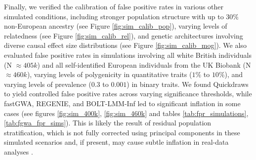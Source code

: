 %
Finally, we verified the calibration of false positive rates in various other simulated conditions, including stronger population structure with up to $30\%$ non-European ancestry (see Figure \ref{fig:sim_calib_pop}), varying levels of relatedness (see Figure \ref{fig:sim_calib_rel}), and genetic architectures involving diverse causal effect size distributions (see Figure \ref{fig:sim_calib_mog}).
%
We also evaluated false positive rates in simulations involving all white British individuals (N $\approx 405k$) and all self-identified European individuals from the UK Biobank (N $\approx 460k$), varying levels of polygenicity in quantitative traits ($1\%$ to $10\%$), and varying levels of prevalence ($0.3$ to $0.001$) in binary traits. We found Quickdraws to yield controlled false positive rates across varying significance thresholds, while fastGWA, REGENIE, and BOLT-LMM-Inf led to significant inflation in some cases (see figures \ref{fig:sim_400k}, \ref{fig:sim_460k} and tables \ref{tab:fpr_simulations}, \ref{tab:fgwa_fpr_sims}).
%
This is likely the result of residual population stratification, which is not fully corrected using principal components in these simulated scenarios and, if present, may cause subtle inflation in real-data analyses \cite{haworth2019apparent,sohail2019polygenic,berg2019reduced}.

\begingroup
\renewcommand{\arraystretch}{1.2} %

